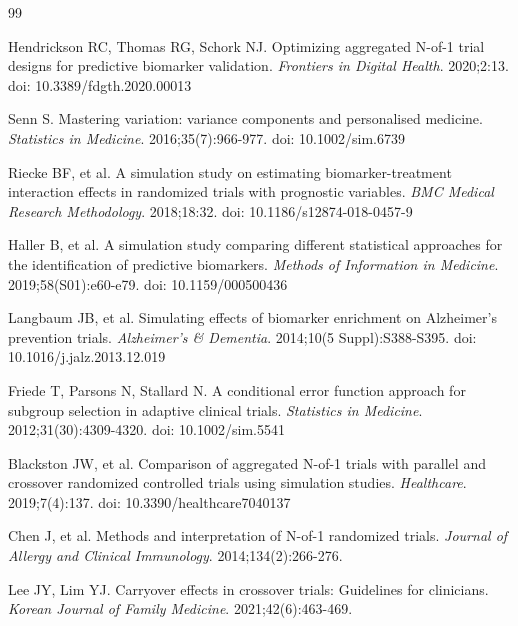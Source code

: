 \documentclass[12pt,a4paper]{article}
\begin{document}
\begin{thebibliography}{99}

Hendrickson RC, Thomas RG, Schork NJ.
Optimizing aggregated N-of-1 trial designs for predictive biomarker validation.
\textit{Frontiers in Digital Health}. 2020;2:13.
doi: 10.3389/fdgth.2020.00013

Senn S.
Mastering variation: variance components and personalised medicine.
\textit{Statistics in Medicine}. 2016;35(7):966-977.
doi: 10.1002/sim.6739

Riecke BF, et al.
A simulation study on estimating biomarker-treatment interaction effects in randomized trials with prognostic variables.
\textit{BMC Medical Research Methodology}. 2018;18:32.
doi: 10.1186/s12874-018-0457-9

Haller B, et al.
A simulation study comparing different statistical approaches for the identification of predictive biomarkers.
\textit{Methods of Information in Medicine}. 2019;58(S01):e60-e79.
doi: 10.1159/000500436

Langbaum JB, et al.
Simulating effects of biomarker enrichment on Alzheimer's prevention trials.
\textit{Alzheimer's \& Dementia}. 2014;10(5 Suppl):S388-S395.
doi: 10.1016/j.jalz.2013.12.019

Friede T, Parsons N, Stallard N.
A conditional error function approach for subgroup selection in adaptive clinical trials.
\textit{Statistics in Medicine}. 2012;31(30):4309-4320.
doi: 10.1002/sim.5541

Blackston JW, et al.
Comparison of aggregated N-of-1 trials with parallel and crossover randomized controlled trials using simulation studies.
\textit{Healthcare}. 2019;7(4):137.
doi: 10.3390/healthcare7040137

Chen J, et al.
Methods and interpretation of N-of-1 randomized trials.
\textit{Journal of Allergy and Clinical Immunology}. 2014;134(2):266-276.

Lee JY, Lim YJ.
Carryover effects in crossover trials: Guidelines for clinicians.
\textit{Korean Journal of Family Medicine}. 2021;42(6):463-469.

\end{thebibliography}
\end{document}
